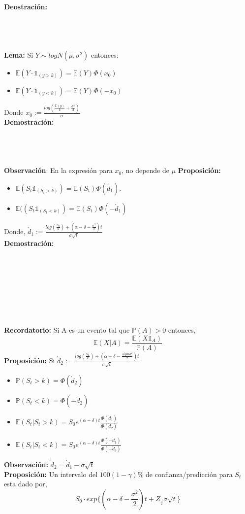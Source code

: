 \documentclass[12pts]{extarticle}
\begin{document}
\textbf{Deostración:}
\\ \\ \\ \\ \\ 
\textbf{Lema:} Si $Y \sim logN(\mu, \sigma^2)$ entonces: 
\begin{itemize}
\item $\mathbb{E}(Y \cdot \mathbb{1}_{(y>k)})=\mathbb{E}(Y)\Phi(x_0)$
\item  $\mathbb{E}(Y \cdot \mathbb{1}_{(y<k)})=\mathbb{E}(Y)\Phi(-x_0)$
 \end{itemize}
Donde $x_0 := \frac{log(\frac{\mathbb{E}(y)}{k} + \frac{\sigma^2}{2})}{\sigma}$
\\ \textbf{Demostración:}
\\ \\ \\ \\ \\ 
\textbf{Observación}: En la expresión para $x_0$, no depende de $\mu$ 
\textbf{Proposición:}
\begin{itemize}
\item $\mathbb{E}(S_t \mathbb{1}_{(S_t > k)})=\mathbb{E}(S_t)\Phi(\dot d_1)$.
\item$\mathbb{E}((S_t \mathbb{1}_{(S_t < k)})=\mathbb{E}(S_t)\Phi(-\dot d_1)$
\end{itemize}
Donde, $\dot d_1:= \frac{log(\frac{S_0}{k})+(\alpha -\delta-\frac{\sigma^2}{2})t}{\sigma\sqrt{t}}$ \\
\textbf{Demostración:} 
\\ \\ \\ \\ \\ \\ \\ \\ \\
\textbf{Recordatorio:} Si A es un evento tal que $\mathbb{P}(A)>0$ entonces, $$ \mathbb{E}(X|A)=\frac{\mathbb{E}(X \mathbb{1}_A)}{\mathbb{P}(A)}$$
\textbf{Proposición:} Si $\dot d_2 := \frac{log(\frac{S_0}{k}) + (\alpha -\delta -\frac{sigma^2}{2})t}{\sigma \sqrt{t}}$
\begin{itemize}
\item $\mathbb{P}(S_t >k)=\Phi (\dot d_2)$
\item $\mathbb{P}(S_t <k)=\Phi (-\dot d_2)$
\item $\mathbb{E}(S_t|S_t >k)= S_0 e^{(\alpha-\delta)t} \frac{\Phi (\dot d_1)}{\Phi (\dot d_2)}$
\item $\mathbb{E}(S_t|S_t <k)= S_0 e^{(\alpha-\delta)t} \frac{\Phi (-\dot d_1)}{\Phi (-\dot d_2)}$
\end{itemize}
\textbf{Observación:} $\dot d_2 = \dot d_1 -\sigma \sqrt{t}$\\
\textbf{Proposición:} Un intervalo del $100(1-\gamma)\%$ de confianza/predicción para $S_t$ esta dado por, $$S_0 \cdot exp\{(\alpha-\delta-\frac{\sigma^2}{2})t + Z_{\frac{\gamma}{2}} \sigma \sqrt{t}\}$$


 
\end{document}
